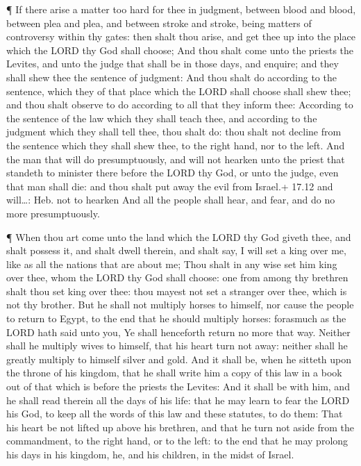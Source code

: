  ¶ If there arise a matter too hard for thee in judgment,
between blood and blood, between plea and plea, and between stroke and
stroke, being matters of controversy within thy gates: then shalt thou
arise, and get thee up into the place which the LORD thy God shall
choose;  And thou shalt come unto the priests the Levites,
and unto the judge that shall be in those days, and enquire; and they
shall shew thee the sentence of judgment:  And thou shalt
do according to the sentence, which they of that place which the LORD
shall choose shall shew thee; and thou shalt observe to do according to
all that they inform thee:  According to the sentence of
the law which they shall teach thee, and according to the judgment which
they shall tell thee, thou shalt do: thou shalt not decline from the
sentence which they shall shew thee, to the right hand, nor to the left.
 And the man that will do presumptuously, and will not
hearken unto the priest that standeth to minister there before the LORD
thy God, or unto the judge, even that man shall die: and thou shalt put
away the evil from Israel.+ 17.12 and will\ldots: Heb. not to hearken
 And all the people shall hear, and fear, and do no more
presumptuously.

 ¶ When thou art come unto the land which the LORD thy God
giveth thee, and shalt possess it, and shalt dwell therein, and shalt
say, I will set a king over me, like as all the nations that are about
me;  Thou shalt in any wise set him king over thee, whom
the LORD thy God shall choose: one from among thy brethren shalt thou
set king over thee: thou mayest not set a stranger over thee, which is
not thy brother.  But he shall not multiply horses to
himself, nor cause the people to return to Egypt, to the end that he
should multiply horses: forasmuch as the LORD hath said unto you, Ye
shall henceforth return no more that way.  Neither shall he
multiply wives to himself, that his heart turn not away: neither shall
he greatly multiply to himself silver and gold.  And it
shall be, when he sitteth upon the throne of his kingdom, that he shall
write him a copy of this law in a book out of that which is before the
priests the Levites:  And it shall be with him, and he
shall read therein all the days of his life: that he may learn to fear
the LORD his God, to keep all the words of this law and these statutes,
to do them:  That his heart be not lifted up above his
brethren, and that he turn not aside from the commandment, to the right
hand, or to the left: to the end that he may prolong his days in his
kingdom, he, and his children, in the midst of Israel.

